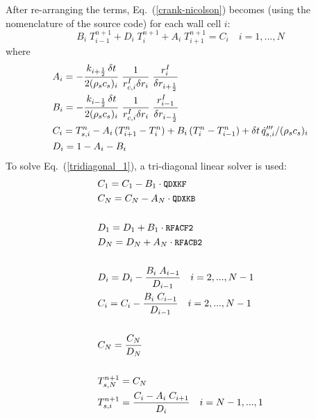 After re-arranging the terms, Eq.~(\ref{crank-nicolson}) becomes (using the nomenclature of the source code) for each wall cell $i$:
 \begin{equation}
\label{tridiagonal_1}
  B_i \; T_{i-1}^{n+1} + D_i \; T_{i}^{n+1} + A_i \; T_{i+1}^{n+1} = C_i \quad i=1,...,N
\end{equation}
where
\begin{equation}
\label{tridiagonal_2}
\begin{split}
& A_i = -\frac{k_{i+\frac{1}{2}} \, \delta t}{2(\rho_s c_s)_i} \; \frac{1}{r_{c,i}^I \delta r_i} \; \frac{r_{i}^I}{\delta r_{i+\frac{1}{2}}}  \\
& B_i = -\frac{k_{i-\frac{1}{2}} \, \delta t}{2(\rho_s c_s)_i} \; \frac{1}{r_{c,i}^I \delta r_i} \; \frac{r_{i-1}^I}{\delta r_{i-\frac{1}{2}}}   \\
& C_i = T_{s,i}^{n}-A_i \, (T_{i+1}^n-T_i^n) + B_i \, (T_{i}^n-T_{i-1}^n) + \delta t \, \dot{q}_{s,i}'''/(\rho_s c_s)_i \\
& D_i = 1-A_i-B_i
\end{split}
\end{equation}
To solve Eq.~(\ref{tridiagonal_1}), a tri-diagonal linear solver is used:
\begin{equation}
\begin{split}
& C_1 = C_1 - B_1 \cdot \texttt{\small QDXKF} \\
& C_N = C_N - A_N \cdot \texttt{\small QDXKB} \\
& \\
& D_1 = D_1 + B_1 \cdot \texttt{\small RFACF2} \\
& D_N = D_N + A_N \cdot \texttt{\small RFACB2} \\
& \\
& D_i = D_i - \frac{B_i \; A_{i-1}}{D_{i-1}} \quad i = 2, ..., N-1 \\
& C_i = C_i - \frac{B_i \; C_{i-1}}{D_{i-1}} \quad i = 2, ..., N-1\\
& \\
& C_N = \frac{C_N}{D_N} \\
& \\
& T^{n+1}_{s,N} = C_N \\
& T^{n+1}_{s,i} = \frac{C_i - A_i \; C_{i+1}}{D_i} \quad i = N-1,..., 1
\end{split}
\end{equation}

